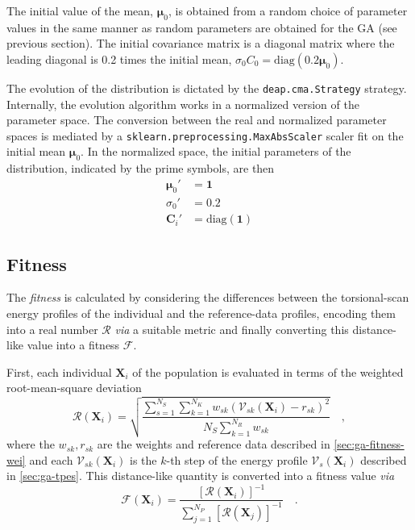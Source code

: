 \documentclass[10pt,a4paper,openany]{memoir}
\numberwithin{equation}{section}
\begin{document}
The initial value of the mean, $\boldsymbol{\mu}_0$,
is obtained from a random choice of parameter values in the same
manner as random parameters are obtained for the GA (see previous
section). The initial covariance matrix is a diagonal matrix where the
leading diagonal is 0.2 times the initial mean,
$\sigma_0 C_0 = \text{diag} (0.2\boldsymbol{\mu}_0)$.

The evolution of the distribution is dictated by the
\texttt{deap.cma.Strategy} strategy.  Internally, the evolution
algorithm works in a normalized version of the parameter space. The
conversion between the real and normalized parameter spaces is
mediated by a \texttt{sklearn.preprocessing.MaxAbsScaler} scaler fit
on the initial mean $\boldsymbol{\mu}_0$. In the normalized space, the
initial parameters of the distribution, indicated by the prime
symbols, are then
\begin{align*}
  \boldsymbol{\mu}_0' & = \mathbf{1} \\
  \sigma_0' & = 0.2 \\
  \boldsymbol{C}_i' & = \text{diag} (\mathbf{1}) 
\end{align*}

\subsection{Fitness}
\label{sec:ga-fitness}

The \textit{fitness} is calculated by considering the differences
between the torsional-scan energy profiles of the individual and the
reference-data profiles, encoding them into a real number
$\mathcal{R}$ \textit{via} a suitable metric and finally converting
this distance-like value into a fitness $\mathcal{F}$.

First, each individual $\mathbf{X}_i$ of the population is evaluated in terms
of the weighted root-mean-square deviation
\begin{equation}
  \label{eq:ga-fitness-rmsd}
  \mathcal{R}\left(\mathbf{X}_i\right) = \sqrt{\frac{\sum_{s=1}^{N_S} \sum_{k=1}^{N_K} w_{sk}(\mathcal{V}_{sk}(\mathbf{X}_i)-r_{sk})^2}{N_S \sum_{k=1}^{N_R} w_{sk}}} \quad ,
\end{equation}
where the $w_{sk},r_{sk}$ are the weights and reference data described in \autoref{sec:ga-fitness-wei}
and each $\mathcal{V}_{sk}(\mathbf{X}_{i})$ is the $k$-th step of the energy profile $\mathcal{V}_s(\mathbf{X}_i)$ described in \autoref{sec:ga-tpes}.
This distance-like quantity is converted into a fitness value \textit{via}
\begin{equation}
  \label{eq:ga-fitness}
  \mathcal{F}(\mathbf{X}_i) =\frac{\left[\mathcal{R}(\mathbf{X}_i)\right]^{-1}}{\sum_{j=1}^{N_P} \left[\mathcal{R}(\mathbf{X}_j)\right]^{-1}} \quad .
\end{equation}
\end{document}
